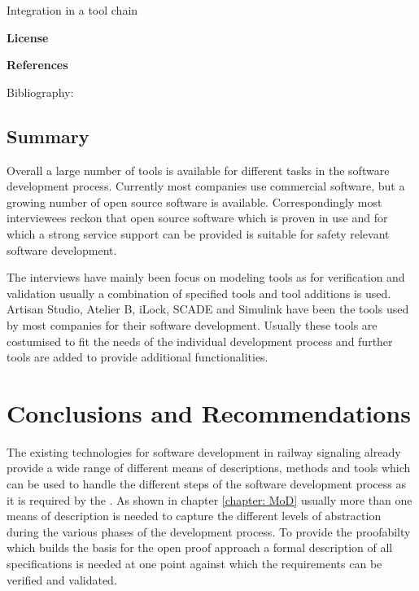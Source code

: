 \documentclass{./template/openetcs2}
\begin{document}
	Integration in a tool chain



	\textbf{License}


	\textbf{References}

	Bibliography:


\section{Summary}

Overall a large number of tools is available for different tasks in the software development process. Currently most companies use commercial software, but a growing number of open source software is available.  Correspondingly most interviewees reckon that open source software which is proven in use and for which a strong service support can be provided is suitable for  safety relevant software development. 

The interviews have mainly been focus on modeling tools as for verification and validation usually a combination of specified tools and tool additions is used. Artisan Studio, Atelier B, iLock, SCADE and Simulink have been the tools used by most companies for their software development. Usually these tools are  costumised to fit the needs of the individual development process and further tools are added to provide additional functionalities.

\chapter{Conclusions and Recommendations}

The existing technologies for software development in railway signaling already provide a wide range of different means of descriptions, methods and tools which can be used to handle the different steps of the software development process as it is required by the \citeauthor{EN50128:2011}. As shown in chapter \ref{chapter: MoD} usually more than one means of description is needed to capture the different levels of abstraction during the various phases of the development process. To provide the proofabilty which builds the basis for the open proof approach a formal description of all specifications is needed at one point against which the requirements can be verified and validated. 
\end{document}
